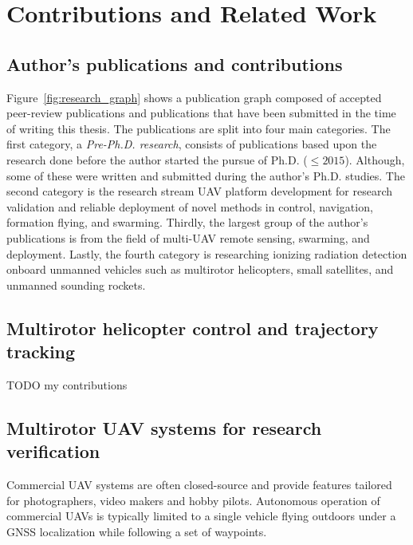 \documentclass[a4paper,11pt,titlepage,twoside]{book}
\newcommand{\todo}[1]{{\color{red} TODO {#1}}}
\newcommand{\chapternoclear}[1]{
  \begingroup
  \let\cleardoublepage\clearpage
  \chapter{#1}
  \endgroup
}
\begin{document}

\chapternoclear{Contributions and Related Work\label{chap:sota}}

\section{Author's publications and contributions}

Figure~\ref{fig:research_graph} shows a publication graph composed of accepted peer-review publications and publications that have been submitted in the time of writing this thesis.
The publications are split into four main categories.
The first category, a \emph{Pre-Ph.D. research}, consists of publications based upon the research done before the author started the pursue of Ph.D. ($\leq 2015$).
Although, some of these were written and submitted during the author's Ph.D. studies.
The second category is the research stream \ac{UAV} platform development for research validation and reliable deployment of novel methods in control, navigation, formation flying, and swarming.
Thirdly, the largest group of the author's publications is from the field of multi-\ac{UAV} remote sensing, swarming, and deployment.
Lastly, the fourth category is researching ionizing radiation detection onboard unmanned vehicles such as multirotor helicopters, small satellites, and unmanned sounding rockets.

\section{Multirotor helicopter control and trajectory tracking}

\todo{my contributions}
\cite{baca2016embedded} %
\cite{baca2018model} %
\cite{baca2020mrs} %

\section{Multirotor UAV systems for research verification}

Commercial \ac{UAV} systems are often closed-source and provide features tailored for photographers, video makers and hobby pilots.
Autonomous operation of commercial \acp{UAV} is typically limited to a single vehicle flying outdoors under a \ac{GNSS} localization while following a set of waypoints.

\end{document}
